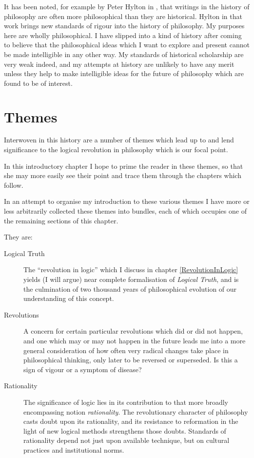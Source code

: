 It has been noted, for example by Peter Hylton in \cite{hyltonREAP}, that writings in the history of philosophy are often more philosophical than they are historical.
Hylton in that work brings new standards of rigour into the history of philosophy.
My purposes here are wholly philosophical.
I have slipped into a kind of history after coming to believe that the philosophical ideas which I want to explore and present cannot be made intelligible in any other way.
My standards of historical scholarship are very weak indeed, and my attempts at history are unlikely to have any merit unless they help to make intelligible ideas for the future of philosophy which are found to be of interest.

\section{Themes}

Interwoven in this history are a number of themes which lead up to and lend significance to the logical revolution in philosophy which is our focal point.

In this introductory chapter I hope to prime the reader in these themes, so that she may more easily see their point and trace them through the chapters which follow.

In an attempt to organise my introduction to these various themes I have more or less arbitrarily collected these themes into bundles, each of which occupies one of the remaining sections of this chapter.

They are:
\begin{description}
\item[Logical Truth]
The ``revolution in logic'' which I discuss in chapter \ref{RevolutionInLogic} yields (I will argue) near complete formalisation of {\it Logical Truth}, and is the culmination of two thousand years of philosophical evolution of our understanding of this concept.

\item[Revolutions]
A concern for certain particular revolutions which did or did not happen, and one which may or may not happen in the future leads me into a more general consideration of how often very radical changes take place in philosophical thinking, only later to be reversed or superseded.
Is this a sign of vigour or a symptom of disease?

\item[Rationality]
The significance of logic lies in its contribution to that more broadly encompassing notion {\it rationality}.
The revolutionary character of philosophy casts doubt upon its rationality, and its resistance to reformation in the light of new logical methods strengthens those doubts.
Standards of rationality depend not just upon available technique, but on cultural practices and institutional norms.

\end{description}

